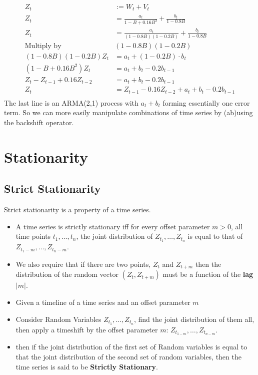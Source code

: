 \begin{equation*}
    \begin{aligned}
        Z_{t} &:= W_{t} + V_{t} \\
        Z_{t} &= \frac{a_{t}}{1-B + 0.16B^{2}} + \frac{b_{t}}{1-0.8B} \\
        Z_{t} &= \frac{a_{t}}{(1-0.8B)(1-0.2B)} + \frac{b_{t}}{1-0.8B} \\
        \text{Multiply by } & (1-0.8B)(1-0.2B) \\
        (1-0.8B)(1-0.2B)Z_{t} &= a_{t} + (1-0.2B)\cdot b_{t}  \\
        (1-B + 0.16B^{2})Z_{t} &= a_{t} + b_{t} - 0.2b_{t-1} \\
        Z_{t}-Z_{t-1} + 0.16Z_{t-2} &= a_{t} + b_{t} - 0.2b_{t-1} \\
        Z_{t} &= Z_{t-1} - 0.16Z_{t-2} + a_{t} + b_{t} - 0.2b_{t-1} \\
    \end{aligned}
\end{equation*}
The last line is an ARMA(2,1) process with $a_{t} + b_{t}$ forming essentially
one error term. So we can more easily manipulate combinations of time series by
(ab)using the backshift operator.


\section{Stationarity}
\subsection{Strict Stationarity}
Strict stationarity is a property of a time series.
\begin{itemize}
    \item A time series is strictly stationary iff for every offset parameter
        $m > 0$, all time points $t_1, \dots, t_n$, the joint distribution of
        $Z_{t_1}, \dots, Z_{t_n}$ is equal to that of $Z_{t_1 - m},
        \dots, Z_{t_n-m}$.
    \item We also require that if there are two points, $Z_t$ and  $Z_{t+m}$
        then  the distribution of the random vector  $\left( Z_t,
        Z_{t+m}\right)$ must be a function of the \textbf{lag} $|m|$.
    \item Given a timeline of a time series and an offset parameter $m$ 
    \item Consider Random Variables $Z_{t_1}, \dots, Z_{t_n}$, find the joint
        distribution of them all, then apply a timeshift by the offset
        parameter $m$: $Z_{t_{1-m}}, \dots, Z_{t_{n-m}}$.
    \item then if the joint distribution of the first set of Random variables
        is equal to that the joint distribution of the second set of random
        variables, then the time series is said to be \textbf{Strictly
        Stationary}.
\end{itemize}

